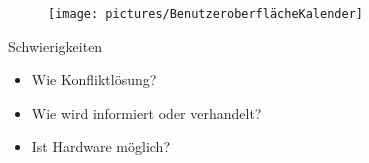 \begin{frame}
    \begin{figure}
        \centering
        \texttt{[image: pictures/BenutzeroberflächeKalender]}
        \label{fig: Mockup Übersicht}
    \end{figure}
\end{frame}

\begin{frame}{Schwierigkeiten}
    \begin{itemize}
        \item Wie Konfliktlösung?
        \item Wie wird informiert oder verhandelt?
        \item Ist Hardware möglich?
    \end{itemize}
\end{frame}
